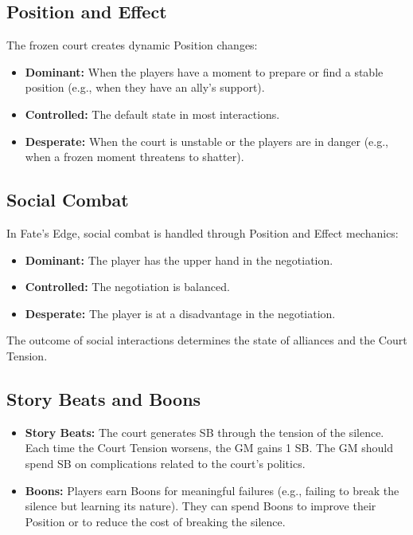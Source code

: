 \documentclass{article}
\begin{document}
\subsection{Position and Effect}

The frozen court creates dynamic Position changes:

\begin{itemize}
    \item \textbf{Dominant:} When the players have a moment to prepare or find a stable position (e.g., when they have an ally's support).
    \item \textbf{Controlled:} The default state in most interactions.
    \item \textbf{Desperate:} When the court is unstable or the players are in danger (e.g., when a frozen moment threatens to shatter).
\end{itemize}

\subsection{Social Combat}

In Fate's Edge, social combat is handled through Position and Effect mechanics:

\begin{itemize}
    \item \textbf{Dominant:} The player has the upper hand in the negotiation.
    \item \textbf{Controlled:} The negotiation is balanced.
    \item \textbf{Desperate:} The player is at a disadvantage in the negotiation.
\end{itemize}

The outcome of social interactions determines the state of alliances and the Court Tension.

\subsection{Story Beats and Boons}

\begin{itemize}
    \item \textbf{Story Beats:} The court generates SB through the tension of the silence. Each time the Court Tension worsens, the GM gains 1 SB. The GM should spend SB on complications related to the court's politics.
    \item \textbf{Boons:} Players earn Boons for meaningful failures (e.g., failing to break the silence but learning its nature). They can spend Boons to improve their Position or to reduce the cost of breaking the silence.
\end{itemize}
\end{document}
